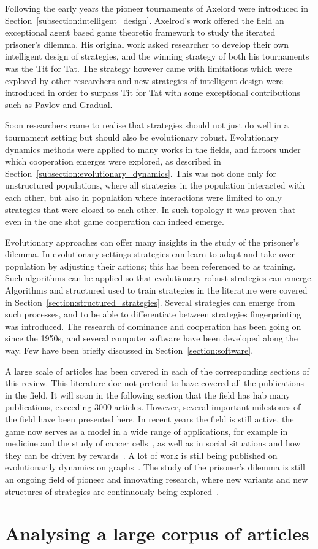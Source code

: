 \documentclass{article}
\theoremstyle{definition}
\begin{document}
Following the early years the pioneer tournaments of Axelord were introduced
in Section~\ref{subsection:intelligent_design}. Axelrod's work offered the field
an exceptional agent based game theoretic framework to study the iterated prisoner's
dilemma. His original work asked researcher to develop their own intelligent
design of strategies, and the winning strategy of both his tournaments was the
Tit for Tat. The strategy however came with limitations which were explored by other
researchers and new strategies of intelligent design were introduced in order to surpass
Tit for Tat with some exceptional contributions such as Pavlov and Gradual.

Soon researchers came to realise that strategies should not just do well in a tournament setting
but should also be evolutionary robust. Evolutionary dynamics methods were
applied to many works in the fields, and factors under which cooperation
emerges were explored, as described in Section~\ref{subsection:evolutionary_dynamics}.
This was not done only for unstructured populations, where all strategies
in the population interacted with each other, but also in population where
interactions were limited to only strategies that were closed to each other.
In such topology it was proven that even in the one shot game cooperation can
indeed emerge.

Evolutionary approaches can offer many insights in the study of the prisoner's
dilemma. In evolutionary settings strategies can learn to adapt and take over
population by adjusting their actions; this has been referenced to as training.
Such algorithms can be applied so that evolutionary robust strategies can emerge.
Algorithms and structured used to train strategies in the literature were covered in
Section~\ref{section:structured_strategies}. Several strategies can emerge from
such processes, and to be able to differentiate between strategies fingerprinting
was introduced. The research of dominance and cooperation has been going on
since the 1950s, and several computer software have been developed along the way.
Few have been briefly discussed in Section~\ref{section:software}.

A large scale of articles has been covered in each of the corresponding sections
of this review. This literature doe not pretend to have covered all the publications
in the field. It will soon in the following section that the field has hab many
publications, exceeding 3000 articles. However, several important milestones
of the field have been presented here. In recent years the field is still active,
the game now serves as a model in a wide range of applications,
for example in medicine and the study of cancer cells~\cite{archetti2018, Kaznatchee2017},
as well as in social situations and how they can be driven by rewards~\cite{Dridi2018}.
A lot of work is still being published on  evolutionarily dynamics on graphs~\cite{Allen2017, hathcock2018, Liu2017}.
The study of the prisoner's dilemma is still an ongoing field of pioneer and innovating research,
where new variants and new structures of strategies are continuously being explored~\cite{Ohtsuki2018}.


\section{Analysing a large corpus of articles}\label{section:analysis}

\newpage


\end{document}
